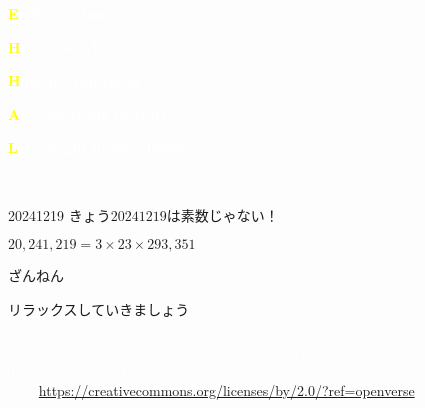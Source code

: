 \documentclass[aspectratio=169,xcolor={dvipsnames,table}]{beamer}
\makeatletter
\newcommand*{\themonth}{\two@digits\month}
\newcommand*{\theday}{\two@digits\day}
\newcommand{\mytoday}{{\the\year}--{\themonth}--{\theday}}
\makeatother
\begin{document}
\begin{frame}
\raggedleft
  \textcolor{white}{\Huge\bfseries \textcolor{yellow}{E}nglish is fun.}

\vfill

\vfill

\raggedleft
 \textcolor{white}{\LARGE\bfseries \textcolor{yellow}{H}ello, everybody!}

 \textcolor{white}{\LARGE\bfseries \textcolor{yellow}{H}ow are you today?}

\raggedleft
 \textcolor{white}{\LARGE\bfseries \textcolor{yellow}{A}re you ready to start?}

 \textcolor{white}{\LARGE\bfseries \textcolor{yellow}{L}et's begin today's lesson.}

\vfill

\raggedleft
 \textcolor{white}{\Large \bfseries \mytoday}

\hyperlink{today}{}
\end{frame}
%
%
%
%
\begin{frame}[plain]{20241219}
 \Large
\centering
\pause
\vfill
きょう$20241219$は素数\pause{}じゃない！\pause

$20{,}241{,}219=3\times{}23\times{}293{,}351$\pause

ざんねん\pause

リラックスしていきましょう
\vfill
\raggedleft
\hyperlink{today}{}
\end{frame}
{
  \begin{frame}[b]
    \frametitle{}
\tiny
\raggedright
  \textcolor{white}{ ``Fireworks'' by bayasaa is licensed under CC BY 2.0. }\\
   \textcolor{white}{To view a copy of this license,}\\
   \textcolor{white}{visit \url{https://creativecommons.org/licenses/by/2.0/?ref=openverse}.}
\hfill\hyperlink{today}{}
  \end{frame}
}
\end{document}

